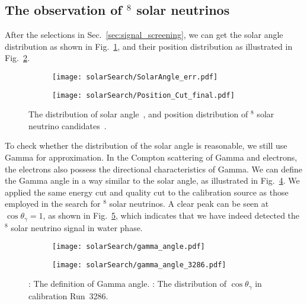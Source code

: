 \subsection{The observation of $^8$ solar neutrinos}
\label{sec:solar_observation}
After the selections in Sec.~\ref{sec:signal_screening}, we can get the solar angle distribution as shown in Fig.~\ref{fig:solar_angle}, and their position distribution as illustrated in Fig.~\ref{fig:solar_pos}.
\begin{figure}[htbp]
	\centering
	\begin{subfigure}{0.5\textwidth}
		\centering
		\texttt{[image: solarSearch/SolarAngle\_err.pdf]}
		\caption{}
		\label{fig:solar_angle}
	\end{subfigure}%
	\begin{subfigure}{0.5\textwidth}
		\centering
		\texttt{[image: solarSearch/Position\_Cut\_final.pdf]}
		\caption{}
		\label{fig:solar_pos}
	\end{subfigure}
	\caption{The distribution of solar angle~,  and position distribution of $^8$ solar neutrino candidates~.}
	\label{fig:solar_final_distribution}
\end{figure}

To check whether the distribution of the solar angle is reasonable, we still use Gamma for approximation. In the Compton scattering of Gamma and electrons, the electrons also possess the directional characteristics of Gamma. We can define the Gamma angle in a way similar to the solar angle, as illustrated in Fig.~\ref{fig:solar_gamma_angle}. We applied the same energy cut and quality cut to the calibration source as those employed in the search for $^8$ solar neutrinos. A clear peak can be seen at $\cos\theta_{\gamma}=1$, as shown in Fig.~\ref{fig:solar_gamma_dis}, which indicates that we have indeed detected the $^8$ solar neutrino signal in water phase.

\begin{figure}[htbp]
	\centering
	\begin{subfigure}{0.5\textwidth}
		\centering
		\texttt{[image: solarSearch/gamma\_angle.pdf]}
		\caption{}
		\label{fig:solar_gamma_angle}
	\end{subfigure}%
	\begin{subfigure}{0.5\textwidth}
		\centering
		\texttt{[image: solarSearch/gamma\_angle\_3286.pdf]}
		\caption{}
		\label{fig:solar_gamma_dis}
	\end{subfigure}
	\caption{: The definition of Gamma angle. : The distribution of $\cos\theta_{\gamma}$ in calibration Run~3286.}
	\label{fig:solar_final_gamma_angle}
\end{figure}


